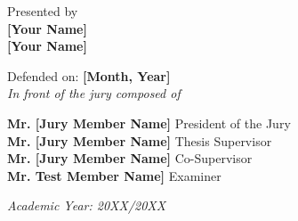 \begin{titlepage}
\normalsize Presented by\\
{\normalsize \textbf{[Your Name]}}\\
{\normalsize \textbf{[Your Name]}}\\

\vspace{0.2cm}

{\normalsize Defended on: \textbf{[Month, Year]}}\\
{\normalsize \textit{In front of the jury composed of}}\\

\vspace{0.2cm}

\begin{center}
    {\normalsize \textbf{Mr. [Jury Member Name]} \hfill President of the Jury}\\
    {\normalsize \textbf{Mr. [Jury Member Name]} \hfill Thesis Supervisor}\\
    {\normalsize \textbf{Mr. [Jury Member Name]} \hfill Co-Supervisor}\\
    {\normalsize \textbf{Mr. Test Member Name]} \hfill Examiner}\\
\end{center}

\vspace{0.5cm}

\normalsize \textit{Academic Year: 20XX/20XX}
\end{titlepage}
